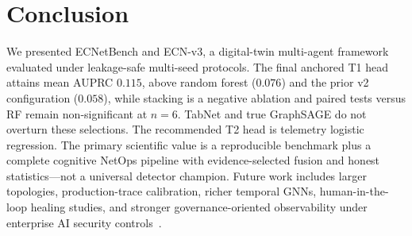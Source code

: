 \section{Conclusion}
\label{sec:conc}

We presented ECNetBench and ECN-v3, a digital-twin multi-agent framework evaluated under leakage-safe multi-seed protocols. The final anchored T1 head attains mean AUPRC $0.115$, above random forest ($0.076$) and the prior v2 configuration ($0.058$), while stacking is a negative ablation and paired tests versus RF remain non-significant at $n{=}6$. TabNet and true GraphSAGE do not overturn these selections. The recommended T2 head is telemetry logistic regression. The primary scientific value is a reproducible benchmark plus a complete cognitive NetOps pipeline with evidence-selected fusion and honest statistics---not a universal detector champion. Future work includes larger topologies, production-trace calibration, richer temporal GNNs, human-in-the-loop healing studies, and stronger governance-oriented observability under enterprise AI security controls~\cite{rah2026semantictracing,rah2026entgenai,rah2026raggovernance,rah2026a2a}.
